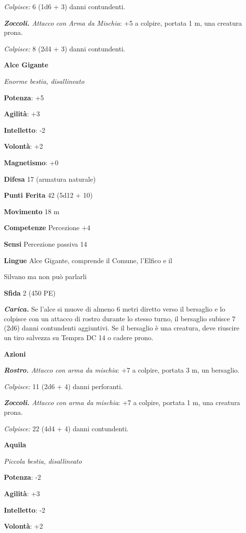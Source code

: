 \begin{multicols}{2}
\emph{Colpisce:} 6 (1d6 + 3) danni contundenti.

\emph{\textbf{Zoccoli.} Attacco con Arma da Mischia}: +5 a colpire,
portata 1 m, una creatura prona.

\emph{Colpisce:} 8 (2d4 + 3) danni contundenti.

\textbf{Alce Gigante}

\emph{Enorme bestia, disallineato}

\textbf{Potenza}: +5

\textbf{Agilità}: +3

\textbf{Intelletto}: -2

\textbf{Volontà}: +2

\textbf{Magnetismo}: +0

\textbf{Difesa} 17 (armatura naturale)

\textbf{Punti Ferita} 42 (5d12 + 10)

\textbf{Movimento} 18 m

\textbf{Competenze} Percezione +4

\textbf{Sensi} Percezione passiva 14

\textbf{Lingue} Alce Gigante, comprende il Comune, l'Elfico e il

Silvano ma non può parlarli

\textbf{Sfida} 2 (450 PE)\smallskip

\emph{\textbf{Carica.}} Se l'alce si muove di almeno 6 metri diretto
verso il bersaglio e lo colpisce con un attacco di rostro durante lo
stesso turno, il bersaglio subisce 7 (2d6) danni contundenti aggiuntivi.
Se il bersaglio è una creatura, deve riuscire un tiro salvezza su Tempra
DC 14 o cadere prono.

\smallskip\textbf{Azioni}

\emph{\textbf{Rostro.} Attacco con arma da mischia}: +7 a colpire,
portata 3 m, un bersaglio.

\emph{Colpisce:} 11 (2d6 + 4) danni perforanti.

\emph{\textbf{Zoccoli.} Attacco con arma da mischia}: +7 a colpire,
portata 1 m, una creatura prona.

\emph{Colpisce:} 22 (4d4 + 4) danni contundenti.

\textbf{Aquila}

\emph{Piccola bestia, disallineato}

\textbf{Potenza}: -2

\textbf{Agilità}: +3

\textbf{Intelletto}: -2

\textbf{Volontà}: +2


\end{multicols}
